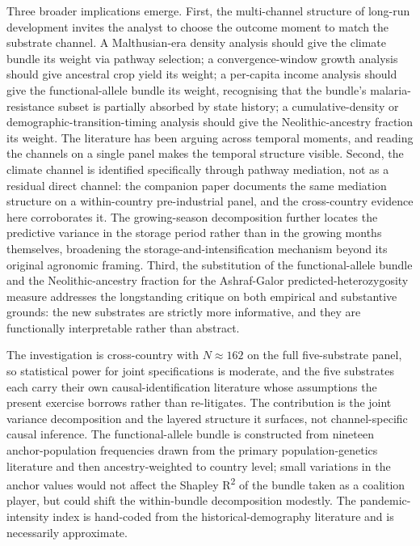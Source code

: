 \documentclass[11pt,letterpaper]{article}
\begin{document}
Three broader implications emerge. First, the multi-channel structure of long-run development invites the analyst to choose the outcome moment to match the substrate channel. A Malthusian-era density analysis should give the climate bundle its weight via pathway selection; a convergence-window growth analysis should give ancestral crop yield its weight; a per-capita income analysis should give the functional-allele bundle its weight, recognising that the bundle's malaria-resistance subset is partially absorbed by state history; a cumulative-density or demographic-transition-timing analysis should give the Neolithic-ancestry fraction its weight. The literature has been arguing across temporal moments, and reading the channels on a single panel makes the temporal structure visible. Second, the climate channel is identified specifically through pathway mediation, not as a residual direct channel: the companion paper documents the same mediation structure on a within-country pre-industrial panel, and the cross-country evidence here corroborates it. The growing-season decomposition further locates the predictive variance in the storage period rather than in the growing months themselves, broadening the storage-and-intensification mechanism beyond its original agronomic framing. Third, the substitution of the functional-allele bundle and the Neolithic-ancestry fraction for the Ashraf-Galor predicted-heterozygosity measure addresses the longstanding \citet{guedes2013} critique on both empirical and substantive grounds: the new substrates are strictly more informative, and they are functionally interpretable rather than abstract.

The investigation is cross-country with $N \approx 162$ on the full five-substrate panel, so statistical power for joint specifications is moderate, and the five substrates each carry their own causal-identification literature whose assumptions the present exercise borrows rather than re-litigates. The contribution is the joint variance decomposition and the layered structure it surfaces, not channel-specific causal inference. The functional-allele bundle is constructed from nineteen anchor-population frequencies drawn from the primary population-genetics literature and then ancestry-weighted to country level; small variations in the anchor values would not affect the Shapley R\textsuperscript{2} of the bundle taken as a coalition player, but could shift the within-bundle decomposition modestly. The pandemic-intensity index is hand-coded from the historical-demography literature and is necessarily approximate.
\end{document}
